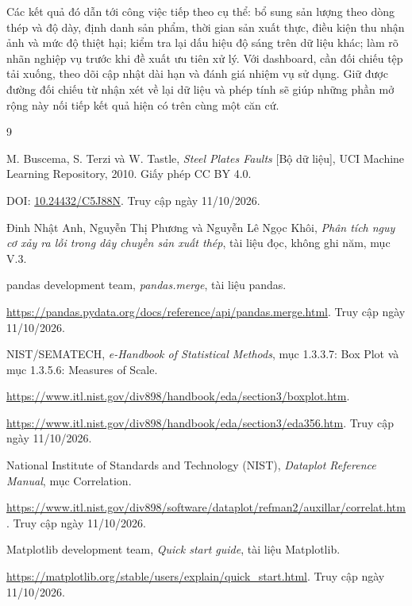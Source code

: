 \documentclass[12pt,a4paper,oneside]{report}
\begin{document}
Các kết quả đó dẫn tới công việc tiếp theo cụ thể: bổ sung sản lượng theo dòng thép và độ dày, định danh sản phẩm, thời gian sản xuất thực, điều kiện thu nhận ảnh và mức độ thiệt hại; kiểm tra lại dấu hiệu độ sáng trên dữ liệu khác; làm rõ nhãn nghiệp vụ trước khi đề xuất ưu tiên xử lý. Với dashboard, cần đối chiếu tệp tải xuống, theo dõi cập nhật dài hạn và đánh giá nhiệm vụ sử dụng. Giữ được đường đối chiếu từ nhận xét về lại dữ liệu và phép tính sẽ giúp những phần mở rộng này nối tiếp kết quả hiện có trên cùng một căn cứ.
\clearpage
\renewcommand{\bibname}{Tài liệu tham khảo}
\begin{thebibliography}{9}

  M. Buscema, S. Terzi và W. Tastle,
  \textit{Steel Plates Faults} [Bộ dữ liệu],
  UCI Machine Learning Repository, 2010.
  Giấy phép CC BY 4.0.
  \par\noindent
  DOI: \href{https://doi.org/10.24432/C5J88N}{10.24432/C5J88N}.
  Truy cập ngày 11/10/2026.

  Đinh Nhật Anh, Nguyễn Thị Phương và Nguyễn Lê Ngọc Khôi,
  \textit{Phân tích nguy cơ xảy ra lỗi trong dây chuyền sản xuất thép},
  tài liệu đọc, không ghi năm, mục V.3.

  pandas development team,
  \textit{pandas.merge}, tài liệu pandas.
  \par\noindent
  \url{https://pandas.pydata.org/docs/reference/api/pandas.merge.html}.
  Truy cập ngày 11/10/2026.

  NIST/SEMATECH,
  \textit{e-Handbook of Statistical Methods},
  mục 1.3.3.7: Box Plot và mục 1.3.5.6: Measures of Scale.
  \par\noindent
  \url{https://www.itl.nist.gov/div898/handbook/eda/section3/boxplot.htm}.
  \par\noindent
  \url{https://www.itl.nist.gov/div898/handbook/eda/section3/eda356.htm}.
  Truy cập ngày 11/10/2026.

  National Institute of Standards and Technology (NIST),
  \textit{Dataplot Reference Manual}, mục Correlation.
  \par\noindent
  \url{https://www.itl.nist.gov/div898/software/dataplot/refman2/auxillar/correlat.htm}.
  Truy cập ngày 11/10/2026.

  Matplotlib development team,
  \textit{Quick start guide}, tài liệu Matplotlib.
  \par\noindent
  \url{https://matplotlib.org/stable/users/explain/quick_start.html}.
  Truy cập ngày 11/10/2026.


\end{thebibliography}
\end{document}
